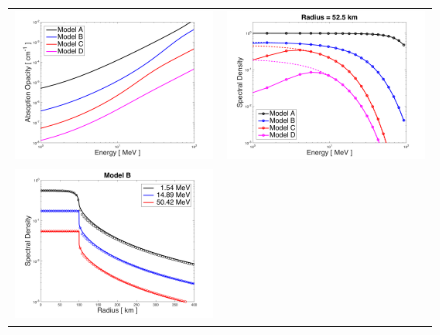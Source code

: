 \documentclass[10pt,preprint]{aastex}
\begin{document}
\begin{figure}
  \begin{center}
    \begin{tabular}{cc}
      \includegraphics[scale=0.4]{./Figures/HomogeneousSphere_Opacities} &
      \includegraphics[scale=0.4]{./Figures/HomogeneousSphere_BaseSpectra} \\
      \includegraphics[scale=0.4]{./Figures/HomogeneousSphere_VsRadius_B} &

\end{tabular}
\end{center}
\end{figure}
\end{document}
